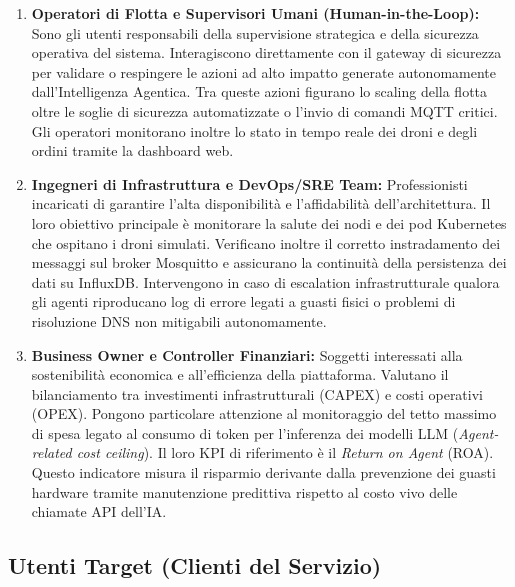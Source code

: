 \begin{enumerate}
    \item \textbf{Operatori di Flotta e Supervisori Umani (Human-in-the-Loop):} 
    Sono gli utenti responsabili della supervisione strategica e della sicurezza operativa del sistema. %
    Interagiscono direttamente con il gateway di sicurezza per validare o respingere le azioni ad alto impatto generate autonomamente dall'Intelligenza Agentica. %
    Tra queste azioni figurano lo scaling della flotta oltre le soglie di sicurezza automatizzate o l'invio di comandi MQTT critici. %
    Gli operatori monitorano inoltre lo stato in tempo reale dei droni e degli ordini tramite la dashboard web. %

    \item \textbf{Ingegneri di Infrastruttura e DevOps/SRE Team:}
    Professionisti incaricati di garantire l'alta disponibilità e l'affidabilità dell'architettura. %
    Il loro obiettivo principale è monitorare la salute dei nodi e dei pod Kubernetes che ospitano i droni simulati. %
    Verificano inoltre il corretto instradamento dei messaggi sul broker Mosquitto e assicurano la continuità della persistenza dei dati su InfluxDB. %
    Intervengono in caso di escalation infrastrutturale qualora gli agenti riproducano log di errore legati a guasti fisici o problemi di risoluzione DNS non mitigabili autonomamente. %

    \item \textbf{Business Owner e Controller Finanziari:}
    Soggetti interessati alla sostenibilità economica e all'efficienza della piattaforma. %
    Valutano il bilanciamento tra investimenti infrastrutturali (CAPEX) e costi operativi (OPEX). %
    Pongono particolare attenzione al monitoraggio del tetto massimo di spesa legato al consumo di token per l'inferenza dei modelli LLM (\textit{Agent-related cost ceiling}). %
    Il loro KPI di riferimento è il \textit{Return on Agent} (ROA). %
    Questo indicatore misura il risparmio derivante dalla prevenzione dei guasti hardware tramite manutenzione predittiva rispetto al costo vivo delle chiamate API dell'IA. %
\end{enumerate}

\subsection*{Utenti Target (Clienti del Servizio)}

